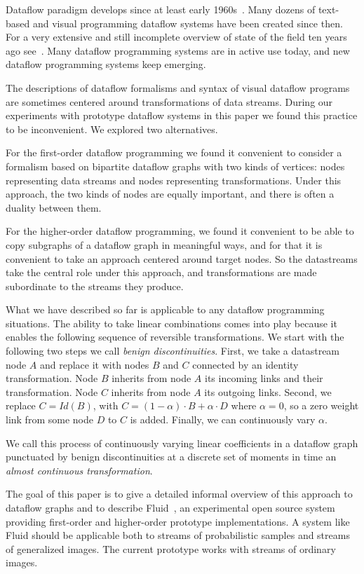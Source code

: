 \documentclass{llncs}
\begin{document}
Dataflow paradigm develops since at least early 1960s~\cite{JKellyLochbaumVyssotsky}. Many dozens of text-based and visual programming
dataflow systems have been created since then. For a very extensive and still incomplete overview of state of the field ten years ago see~\cite{WJohnstonHannaMillar}.
Many dataflow programming systems are in active use today, and new dataflow programming systems keep emerging.

The descriptions of dataflow formalisms and syntax of visual dataflow programs are sometimes centered around transformations of data streams. 
During our experiments with prototype dataflow systems in this paper we found this practice to be inconvenient. We explored two alternatives.

For the first-order dataflow programming we found it convenient to consider a formalism based on bipartite dataflow graphs with two kinds of
vertices:  nodes representing data streams and nodes representing transformations. Under this approach, the two kinds of nodes are equally
important, and there is often a duality between them.

For the higher-order dataflow programming, we found it convenient to be able to copy subgraphs of a dataflow graph in meaningful ways, and
for that it is convenient to take an approach centered around target nodes. So the datastreams take the central role under this approach, 
and transformations are made subordinate to the streams they produce.

What we have described so far is applicable to any dataflow programming situations. The ability to take linear combinations comes into play
because it enables the following sequence of reversible transformations. We start with the following two steps we call {\em benign discontinuities}. First,
we take a datastream node $A$ and replace it with nodes $B$ and $C$ connected by an identity transformation. Node $B$ inherits from node $A$ its
incoming links and their transformation. Node $C$ inherits from node $A$ its outgoing links. Second, we replace $C=Id(B)$, with
$C= (1-\alpha)\cdot B + \alpha \cdot D$ where $\alpha = 0$, so a zero weight link from some node $D$ to $C$ is added. Finally, we can continuously
vary $\alpha$. 

We call this process of continuously varying linear coefficients in a dataflow graph punctuated by benign discontinuities at a discrete set of moments in time 
an {\em almost continuous transformation}.

The goal of this paper is to give a detailed informal overview of this approach to dataflow graphs and to describe Fluid~\cite{Fluid}, an experimental open source system
providing first-order and higher-order prototype implementations. A system like Fluid should be applicable both to streams of probabilistic samples and
streams of generalized images. The current prototype works with streams of ordinary images.
\end{document}
